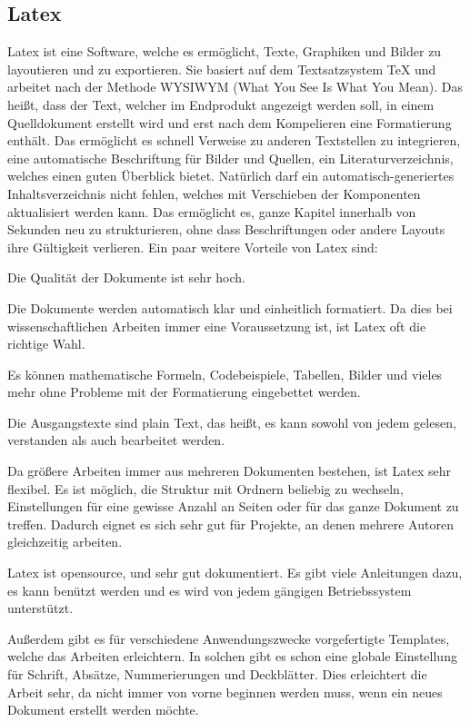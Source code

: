 \subsection{Latex} 


Latex ist eine Software, welche es ermöglicht, Texte, Graphiken und Bilder zu layoutieren und zu exportieren. Sie basiert auf dem Textsatzsystem TeX und arbeitet nach der Methode WYSIWYM (What You See Is What You Mean). Das heißt, dass der Text, welcher im Endprodukt angezeigt werden soll, in einem Quelldokument erstellt wird und erst nach dem Kompelieren eine Formatierung enthält. Das ermöglicht es schnell Verweise zu anderen Textstellen zu integrieren, eine automatische Beschriftung für Bilder und Quellen, ein Literaturverzeichnis, welches einen guten Überblick bietet. Natürlich darf ein automatisch-generiertes Inhaltsverzeichnis nicht fehlen, welches mit Verschieben der Komponenten aktualisiert werden kann. Das ermöglicht es, ganze Kapitel innerhalb von Sekunden neu zu strukturieren, ohne dass Beschriftungen oder andere Layouts ihre Gültigkeit verlieren. Ein paar weitere Vorteile von Latex sind:


\begin{compactitem}
\item Die Qualität der Dokumente ist sehr hoch.
\item Die Dokumente werden automatisch klar und einheitlich formatiert. Da dies bei wissenschaftlichen Arbeiten immer eine Voraussetzung ist, ist Latex oft die richtige Wahl.
\item Es können mathematische Formeln, Codebeispiele, Tabellen, Bilder und vieles mehr ohne Probleme mit der Formatierung eingebettet werden.
\item Die Ausgangstexte sind plain Text, das heißt, es kann sowohl von jedem gelesen, verstanden als auch bearbeitet werden.
\item Da größere Arbeiten immer aus mehreren Dokumenten bestehen, ist Latex sehr flexibel. Es ist möglich, die Struktur mit Ordnern beliebig zu wechseln, Einstellungen für eine gewisse Anzahl an Seiten oder für das ganze Dokument zu treffen. Dadurch eignet es sich sehr gut für Projekte, an denen mehrere Autoren gleichzeitig arbeiten.
\item Latex ist opensource, und sehr gut dokumentiert. Es gibt viele Anleitungen dazu, es kann benützt werden und es wird von jedem gängigen Betriebssystem unterstützt.
\item Außerdem gibt es für verschiedene Anwendungszwecke vorgefertigte Templates, welche das Arbeiten erleichtern. In solchen gibt es schon eine globale Einstellung für Schrift, Absätze, Nummerierungen und Deckblätter. Dies erleichtert die Arbeit sehr, da nicht immer von vorne beginnen werden muss, wenn ein neues Dokument erstellt werden möchte.
\end{compactitem}


